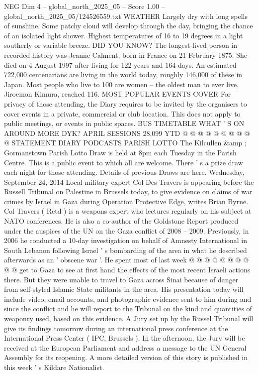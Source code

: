 \begin{textsample}{NEG Dim 4 – global\_north\_2025\_05 – Score 1.00 – global\_north\_2025\_05/124526559.txt}  \label{ex:f4_neg_264}
WEATHER Largely dry with long spells of sunshine.
Some patchy cloud will develop through the day, bringing the chance of an isolated light shower.
Highest temperatures of 16 to 19 degrees in a light southerly or variable breeze.
DID YOU KNOW?
The longest-lived person in recorded history was Jeanne Calment, born in France on 21 February 1875.
She died on 4 August 1997 after living for 122 years and 164 days.
An estimated 722,000 centenarians are living in the world today, roughly 146,000 of these in Japan.
Most people who live to 100 are women -- the oldest man to ever live, Jiroemon Kimura, reached 116.
MOST POPULAR EVENTS COVER For privacy of those attending, the Diary requires to be invited by the organisers to cover events in a private, commercial or club location.
This does not apply to public meetings, or events in public spaces.
BUS TIMETABLE WHAT ' S ON AROUND MORE DYK?
APRIL SESSIONS 28,099 YTD @ @ @ @ @ @ @ @ @ @ STATEMENT DIARY PODCASTS PARISH LOTTO The Kilcullen \&amp ; Gormanstown Parish Lotto Draw is held at 8pm each Tuesday in the Parish Centre.
This is a public event to which all are welcome.
There ' s a prize draw each night for those attending.
Details of previous Draws are here.
Wednesday, September 24, 2014 Local military expert Col Des Travers is appearing before the Russell Tribunal on Palestine in Brussels today, to give evidence on claims of war crimes by Israel in Gaza during Operation Protective Edge, writes Brian Byrne.
Col Travers ( Retd ) is a weapons expert who lectures regularly on his subject at NATO conferences.
He is also a co-author of the Goldstone Report produced under the auspices of the UN on the Gaza conflict of 2008 -- 2009.
Previously, in 2006 he conducted a 10-day investigation on behalf of Amnesty International in South Lebanon following Israel ' s bombarding of the area in what he described afterwards as an ' obscene war '.
He spent most of last week @ @ @ @ @ @ @ @ @ @ get to Gaza to see at first hand the effects of the most recent Israeli actions there.
But they were unable to travel to Gaza across Sinai because of danger from self-styled Islamic State militants in the area.
His presentation today will include video, email accounts, and photographic evidence sent to him during and since the conflict and he will report to the Tribunal on the kind and quantities of weaponry used, based on this evidence.
A Jury set up by the Russel Tribunal will give its findings tomorrow during an international press conference at the International Press Center ( IPC, Brussels ).
In the afternoon, the Jury will be received at the European Parliament and address a message to the UN General Assembly for its reopening.
A more detailed version of this story is published in this week ' s Kildare Nationalist.

\end{textsample}
